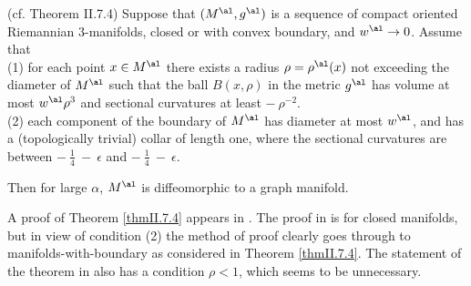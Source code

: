 \begin{theorem}
  \label{thm:kl-thin-part-graph-manifold-existence-thick-thin-geometry}
 (cf. Theorem II.7.4) \label{thmII.7.4}
Suppose that $(M^\al, g^\al)$ is a sequence of compact oriented Riemannian
$3$-manifolds, closed or with convex boundary, and $w^\al \rightarrow 0$.
Assume that \\
(1) for each point $x \in M^\al$ there exists a radius $\rho = \rho^\al(x)$
not exceeding the diameter of $M^\al$
such that
the ball $B(x, \rho)$ in the metric $g^\al$ has volume at most
$w^\al \rho^3$ and sectional curvatures at least $- \: \rho^{-2}$.\\
(2) each component of the boundary of $M^\al$ has diameter at most
$w^\al$, and has a (topologically trivial) collar of length one, where
the sectional curvatures are between $- \: \frac14 \: - \: \epsilon$ and
$- \: \frac14 \: - \: \epsilon$.

Then for large $\alpha$, $M^\al$ is diffeomorphic to a graph manifold.
\end{theorem}

\begin{remark}
  \label{rem:kl-thin-part-graph-manifold-estimates-thick-thin-geometry}

A proof of Theorem \ref{thmII.7.4} appears in \cite[Section 8]{Shioya-Yamaguchi}.
The proof in \cite{Shioya-Yamaguchi} is for closed manifolds, but in
view of condition (2) the method of proof clearly goes through to
manifolds-with-boundary as considered in Theorem \ref{thmII.7.4}.
The statement of the theorem in \cite[Theorem II.7.4]{Perelman2} also has a condition
$\rho < 1$, which seems to be unnecessary.
\end{remark}

